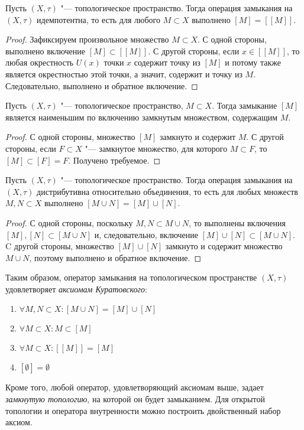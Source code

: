 \begin{proposition}
	Пусть $(X, \tau)$ "--- топологическое пространство. Тогда операция замыкания на $(X, \tau)$ идемпотентна, то есть для любого $M \subset X$ выполнено $[M] = [[M]]$.
\end{proposition}

\begin{proof}
	Зафиксируем произвольное множество $M \subset X$. С одной стороны, выполнено включение $[M] \subset [[M]]$. С другой стороны, если $x \in [[M]]$, то любая окрестность $U(x)$ точки $x$ содержит точку из $[M]$ и потому также является окрестностью этой точки, а значит, содержит и точку из $M$. Следовательно, выполнено и обратное включение.
\end{proof}

\begin{theorem}
	Пусть $(X, \tau)$ "--- топологическое пространство, $M \subset X$. Тогда замыкание $[M]$ является наименьшим по включению замкнутым множеством, содержащим $M$.
\end{theorem}
	
\begin{proof}
	С одной стороны, множество $[M]$ замкнуто и содержит $M$. С другой стороны, если $F \subset X$ "--- замкнутое множество, для которого $M \subset F$, то $[M] \subset [F] = F$. Получено требуемое.
\end{proof}

\begin{proposition}
	Пусть $(X, \tau)$ "--- топологическое пространство. Тогда операция замыкания на $(X, \tau)$ дистрибутивна относительно объединения, то есть для любых множеств $M, N \subset X$ выполнено $[M \cup N] = [M] \cup [N]$.
\end{proposition}

\begin{proof}
	С одной стороны, поскольку $M, N \subset M \cup N$, то выполнены включения $[M], [N] \subset [M \cup N]$ и, следовательно, включение $[M] \cup [N] \subset [M \cup N]$. C другой стороны, множество $[M] \cup [N]$ замкнуто и содержит множество $M \cup N$, поэтому выполнено и обратное включение.
\end{proof}

\begin{note}
	Таким образом, оператор замыкания на топологическом пространстве $(X, \tau)$ удовлетворяет \textit{аксиомам Куратовского}:
	\begin{enumerate}
		\item $\forall M, N \subset X: [M \cup N] = [M] \cup [N]$
		\item $\forall M \subset X: M \subset [M]$
		\item $\forall M \subset X: [[M]] = [M]$
		\item $[\emptyset] = \emptyset$
	\end{enumerate}

	Кроме того, любой оператор, удовлетворяющий аксиомам выше, задает \textit{замкнутую топологию}, на которой он будет замыканием. Для открытой топологии и оператора внутренности можно построить двойственный набор аксиом.
\end{note}

